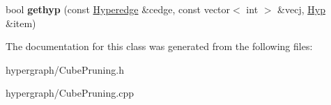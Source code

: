 \begin{DoxyCompactItemize}
\item 
\hypertarget{classCubePruning_aa7d26357be4241b594f9eb24ac52da22}{
bool {\bfseries gethyp} (const \hyperlink{classScarab_1_1HG_1_1Hyperedge}{Hyperedge} \&cedge, const vector$<$ int $>$ \&vecj, \hyperlink{structHyp}{Hyp} \&item)}
\label{classCubePruning_aa7d26357be4241b594f9eb24ac52da22}

\end{DoxyCompactItemize}


The documentation for this class was generated from the following files:\begin{DoxyCompactItemize}
\item 
hypergraph/CubePruning.h\item 
hypergraph/CubePruning.cpp\end{DoxyCompactItemize}
